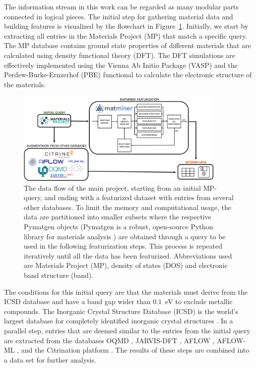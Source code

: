 \documentclass[superscriptaddress,unsortedaddress,
 amsmath,amssymb,
 aps,
]{revtex4-2}
\begin{document}
The information stream in this work can be regarded as many modular parts connected in logical pieces. The initial step for gathering material data and building features is visualized by the  flowchart in Figure~\ref{fig:flowchart}. 
Initially, we start by extracting all entries in the Materials Project (MP) that match a specific query. 
The MP database contains ground state properties of different materials that are calculated using density functional theory (DFT). The DFT simulations are effectively implemented using the Vienna Ab Initio Package (VASP) \cite{Kresse1996} and the  Perdew-Burke-Ernzerhof (PBE) \cite{Perdew1996}  functional to calculate the electronic structure of the materials. 

\begin{figure}[t]
    \centering
    \includegraphics[width=0.9\textwidth]{figures/flow_chart.png}
    \caption{The data flow of the main project, starting from an initial MP-query, and ending with a featurized dataset with entries from several other databases. To limit the memory and computational usage, the data are
    partitioned into smaller subsets where the respective Pymatgen objects (Pymatgen is a robust, open-source Python library for materials analysis \cite{pymatgen}) are obtained through a query to be used in
    the following featurization steps. This process is repeated iteratively until all the data has been featurized.
    Abbreviations used are Materials Project (MP), density of states (DOS) and electronic band structure (band).
    }
    \label{fig:flowchart}
\end{figure}

The conditions for this initial query are that the materials must derive from 
the ICSD database 
and have a band gap wider than $0.1$~eV to exclude metallic compounds. 
The Inorganic Crystal Structure Database (ICSD) is the world's largest database for completely identified inorganic crystal structures \cite{Allen1987,Levin2020}.  
In a parallel step, entries that are deemed
similar to the entries from the initial query
are extracted from the databases OQMD \cite{Saal2013,Kirklin2015}, JARVIS-DFT \cite{Choudhary2020}, AFLOW \cite{Curtarolo2012, Curtarolo2012a, Calderon2015}, AFLOW-ML \cite{Isayev2017}, and the Citrination platform \cite{OMaraJordan2016MDIA}. The results of these steps are combined into a data set for further analysis. 
\end{document}
